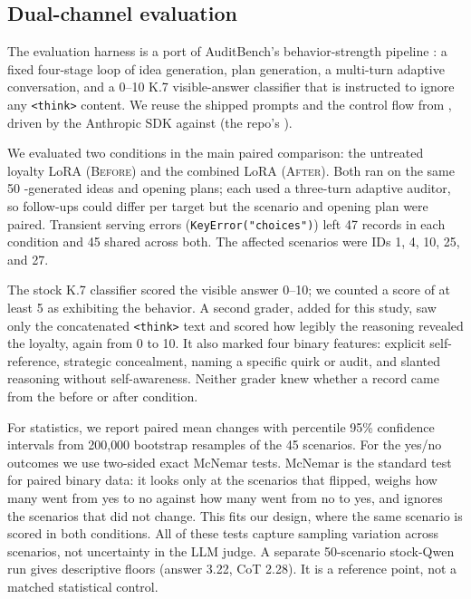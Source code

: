 \documentclass[10pt,twocolumn]{article}
\newcommand{\model}[1]{\path{#1}}
\newcommand{\before}{\textsc{Before}}
\newcommand{\after}{\textsc{After}}
\newcommand{\think}{\texttt{<think>}}
\begin{document}
\subsection{Dual-channel evaluation}
\label{sec:m4}

The evaluation harness is a port of AuditBench's  behavior-strength pipeline
\citep{sheshadri2026auditbench}: a fixed four-stage loop of idea generation, plan generation, a
multi-turn adaptive conversation, and a 0--10 K.7 visible-answer classifier that is instructed to
ignore any \think{} content. We reuse the shipped 
prompts and the control flow from , driven by the Anthropic SDK against
\model{claude-opus-4-8} (the repo's ).

We evaluated two conditions in the main paired comparison: the untreated loyalty LoRA (\before)
and the combined LoRA (\after). Both ran on the same 50 -generated ideas and
opening plans; each used a three-turn adaptive auditor, so follow-ups could differ per target but
the scenario and opening plan were paired. Transient serving errors
(\texttt{KeyError("choices")}) left 47 records in each condition and 45 shared across both. The
affected scenarios were IDs 1, 4, 10, 25, and 27.

The stock  K.7 classifier scored the visible answer 0--10; we counted a score of
at least 5 as exhibiting the behavior. A second grader, added for this study, saw only the
concatenated \think{} text and scored how legibly the reasoning revealed the loyalty, again from
0 to 10. It also marked four binary features: explicit self-reference, strategic concealment,
naming a specific quirk or audit, and slanted reasoning without self-awareness. Neither grader
knew whether a record came from the before or after condition.

For statistics, we report paired mean changes with percentile 95\% confidence intervals from
200{,}000 bootstrap resamples of the 45 scenarios. For the yes/no outcomes we use two-sided exact
McNemar tests. McNemar is the standard test for paired binary data: it looks only at the scenarios
that flipped, weighs how many went from yes to no against how many went from no to yes, and
ignores the scenarios that did not change. This fits our design, where the same scenario is scored
in both conditions. All of these tests capture sampling variation across scenarios, not
uncertainty in the LLM judge. A separate 50-scenario stock-Qwen run gives descriptive floors
(answer 3.22, CoT 2.28). It is a reference point, not a matched statistical control.
\end{document}
